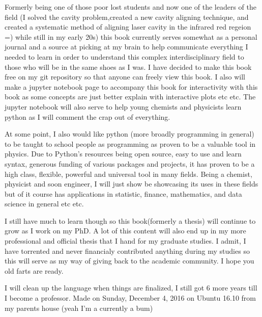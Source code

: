 \documentclass[a4paper]{book}
\begin{document}
		Formerly being one of those poor lost students and now one of the leaders of the field (I solved the cavity problem,created a new cavity aligning technique, and created a systematic method of aligning laser cavity in the infrared red regeion =)  while  still in my early 20s) this book currently serves somewhat as a personal journal and a source at picking at my brain to help communicate everything I needed to learn in order to understand this complex interdisciplinary field to those who will be in the same shoes as I was. I have decided to make this book free on my git repository so that anyone can freely view this book. I also will make a jupyter notebook page to accompany this book for interactivity with this book as some concepts are just better explain with interactive plots etc etc. The jupyter notebook will also serve to help young chemists and physicists learn python as I will comment the crap out of everything.
		
		At some point, I also would like python (more broadly programming in general) to be taught to school people as programming as proven to be a valuable tool in physics. Due to Python's resources being open source, easy to use and learn syntax, generous funding of various packages and projects, it has proven to be a high class, flexible, powerful and universal tool in many fields. Being a chemist, physicist and soon engineer, I will just show be showcasing its uses in these fields but of it course has applications in statistic, finance, mathematics, and data science in general etc etc.
		
		I still have much to learn though so this book(formerly a thesis) will continue to grow as I work on my PhD. A lot of this content will also end up in my more professional and official thesis that I hand for my graduate studies. I admit, I have torrented and never financialy contributed anything during my studies so this will serve as my way of giving back to the academic community. I hope you old farts are ready.

		I will clean up the language when things are finalized, I still got 6 more years till I become a professor. Made on Sunday, December 4, 2016 on Ubuntu 16.10 from my parents house (yeah I'm a currently a bum)
		
		\mainmatter
\end{document}
